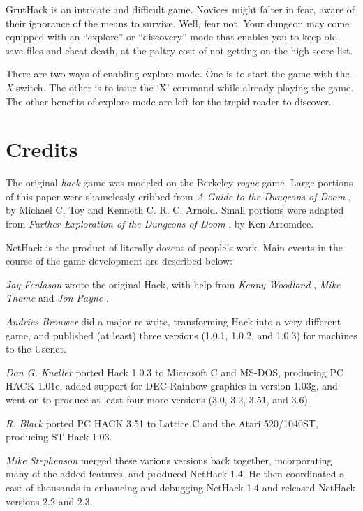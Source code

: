 GrutHack is an intricate and difficult game.  Novices might falter
in fear, aware of their ignorance of the means to survive.  Well, fear
not.  Your dungeon may come equipped with an ``explore'' or ``discovery''
mode that enables you to keep old save files and cheat death, at the
paltry cost of not getting on the high score list.

There are two ways of enabling explore mode.  One is to start the game
with the
{\it -X }
switch.  The other is to issue the `X' command while already playing
the game.  The other benefits of explore mode are left for the trepid
reader to discover.

\section{Credits}

The original %
{\it hack}
game was modeled on the Berkeley 
%
{\it rogue}
game.  Large portions of this paper were shamelessly
cribbed from %
{\it  A Guide to the Dungeons of Doom}%
, by Michael C. Toy
and Kenneth C. R. C. Arnold.  Small portions were adapted from
%
{\it  Further Exploration of the Dungeons of Doom}%
, by Ken Arromdee.

NetHack is the product of literally dozens of people's work.
Main events in the course of the game development are described below:


%
{\it Jay Fenlason}%
wrote the original Hack, with help from
%
{\it Kenny Woodland}%
, %
{\it Mike Thome}%
and %
{\it Jon Payne}%
.

%
{\it Andries Brouwer}%
did a major re-write, transforming Hack into a
very different game, and published (at least) three versions (1.0.1,
1.0.2, and 1.0.3) for
machines to the Usenet.

%
{\it Don G. Kneller}%
ported Hack 1.0.3 to Microsoft C and MS-DOS, producing PC
HACK 1.01e, added support for DEC Rainbow graphics in version 1.03g, and went
on to produce at least four more versions (3.0, 3.2, 3.51, and 3.6).

%
{\it R. Black}%
ported PC HACK 3.51 to Lattice C and the Atari 520/1040ST,
producing ST Hack 1.03.

%
{\it Mike Stephenson}%
merged these various versions back together,
incorporating many of the added features, and produced NetHack 1.4.
He then coordinated a cast of thousands in enhancing and debugging
NetHack 1.4 and released NetHack versions 2.2 and 2.3.

